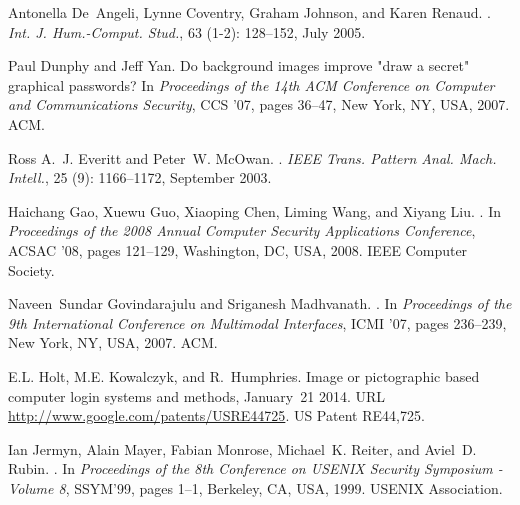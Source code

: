 \documentclass[conference]{IEEEtran}
\begin{document}
\begin{thebibliography}{23}
Antonella De~Angeli, Lynne Coventry, Graham Johnson, and Karen Renaud.
.
\newblock \emph{Int. J. Hum.-Comput. Stud.}, 63 (1-2):
  128--152, July 2005.

Paul Dunphy and Jeff Yan.
\newblock Do background images improve "draw a secret" graphical passwords?
\newblock In \emph{Proceedings of the 14th ACM Conference on Computer and
  Communications Security}, CCS '07, pages 36--47, New York, NY, USA, 2007.
  ACM.

Ross A.~J. Everitt and Peter~W. McOwan.
.
\newblock \emph{IEEE Trans. Pattern Anal. Mach. Intell.}, 25
  (9): 1166--1172, September 2003.

Haichang Gao, Xuewu Guo, Xiaoping Chen, Liming Wang, and Xiyang Liu.
.
\newblock In \emph{Proceedings of the 2008 Annual Computer Security
  Applications Conference}, ACSAC '08, pages 121--129, Washington, DC, USA,
  2008. IEEE Computer Society.

Naveen~Sundar Govindarajulu and Sriganesh Madhvanath.
.
\newblock In \emph{Proceedings of the 9th International Conference on
  Multimodal Interfaces}, ICMI '07, pages 236--239, New York, NY, USA, 2007.
  ACM.

E.L. Holt, M.E. Kowalczyk, and R.~Humphries.
\newblock Image or pictographic based computer login systems and methods,
  January~21 2014.
\newblock URL \url{http://www.google.com/patents/USRE44725}.
\newblock US Patent RE44,725.

Ian Jermyn, Alain Mayer, Fabian Monrose, Michael~K. Reiter, and Aviel~D. Rubin.
.
\newblock In \emph{Proceedings of the 8th Conference on USENIX Security
  Symposium - Volume 8}, SSYM'99, pages 1--1, Berkeley, CA, USA, 1999. USENIX
  Association.


\end{thebibliography}
\end{document}
